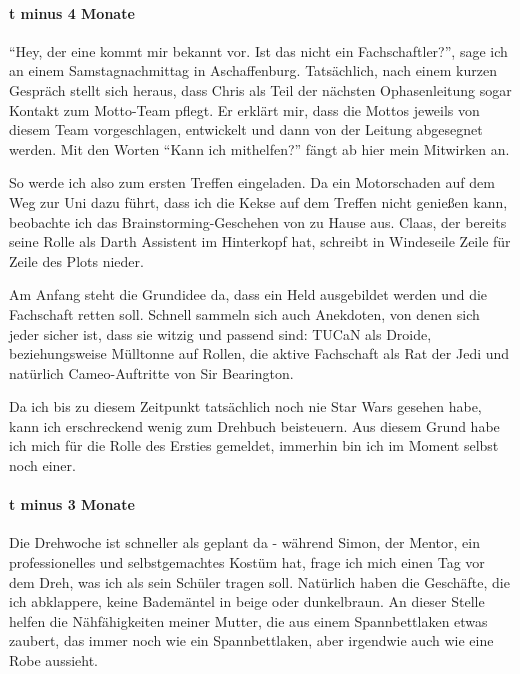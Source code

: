 {    \paragraph{t minus 4 Monate}
    \enquote{Hey, der eine kommt mir bekannt vor. Ist das nicht ein Fachschaftler?}, sage
    ich an einem Samstagnachmittag in Aschaffenburg. Tatsächlich, nach einem kurzen
    Gespräch stellt sich heraus, dass Chris als Teil der nächsten Ophasenleitung
    sogar Kontakt zum Motto-Team pflegt. Er erklärt mir, dass die Mottos jeweils
    von diesem Team vorgeschlagen, entwickelt und dann von der Leitung abgesegnet
    werden. Mit den Worten \enquote{Kann ich mithelfen?} fängt ab hier mein Mitwirken an.

    So werde ich also zum ersten Treffen eingeladen.
    Da ein Motorschaden auf dem Weg zur Uni dazu führt, dass ich die Kekse auf
    dem Treffen nicht genießen kann, beobachte ich das Brainstorming-Geschehen von
    zu Hause aus. Claas, der bereits seine Rolle als Darth Assistent im Hinterkopf
    hat, schreibt in Windeseile Zeile für Zeile des Plots nieder.


    Am Anfang steht die Grundidee da, dass ein Held ausgebildet werden und die
    Fachschaft retten soll. Schnell sammeln sich auch Anekdoten, von denen sich
    jeder sicher ist, dass sie witzig und passend sind: TUCaN als Droide,
    beziehungsweise Mülltonne auf Rollen, die aktive Fachschaft als Rat der Jedi
    und natürlich Cameo-Auftritte von Sir Bearington.


    Da ich bis zu diesem Zeitpunkt tatsächlich noch nie Star Wars gesehen habe,
    kann ich erschreckend wenig zum Drehbuch beisteuern. Aus diesem Grund habe
    ich mich für die Rolle des Ersties gemeldet, immerhin bin ich im Moment selbst
    noch einer.


    \paragraph{t minus 3 Monate}
    Die Drehwoche ist schneller als geplant da - während Simon, der Mentor, ein
    professionelles und selbstgemachtes Kostüm hat, frage ich mich einen Tag vor
    dem Dreh, was ich als sein Schüler tragen soll. Natürlich haben die Geschäfte,
    die ich abklappere, keine Bademäntel in beige oder dunkelbraun. An dieser
    Stelle helfen die Nähfähigkeiten meiner Mutter, die aus einem Spannbettlaken
    etwas zaubert, das immer noch wie ein Spannbettlaken, aber irgendwie auch wie
    eine Robe aussieht.

}
